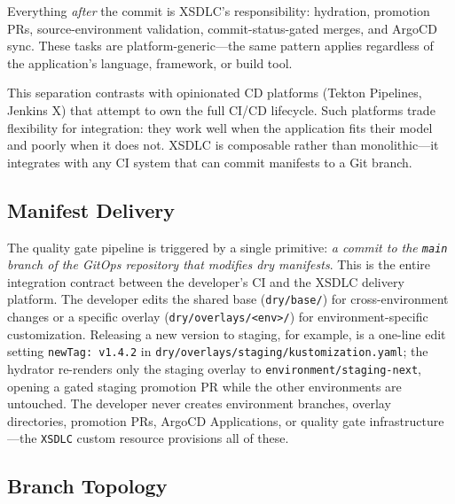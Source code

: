 Everything \textit{after} the commit is XSDLC's responsibility: hydration, promotion PRs, source-environment validation, commit-status-gated merges, and ArgoCD sync. These tasks are platform-generic---the same pattern applies regardless of the application's language, framework, or build tool.

This separation contrasts with opinionated CD platforms (Tekton Pipelines, Jenkins X) that attempt to own the full CI/CD lifecycle. Such platforms trade flexibility for integration: they work well when the application fits their model and poorly when it does not. XSDLC is composable rather than monolithic---it integrates with any CI system that can commit manifests to a Git branch.

\subsection{Manifest Delivery}
\label{subsec:manifest-delivery}

The quality gate pipeline is triggered by a single primitive: \textit{a commit to the \texttt{main} branch of the GitOps repository that modifies dry manifests}. This is the entire integration contract between the developer's CI and the XSDLC delivery platform. The developer edits the shared base (\texttt{dry/base/}) for cross-environment changes or a specific overlay (\texttt{dry/overlays/<env>/}) for environment-specific customization. Releasing a new version to staging, for example, is a one-line edit setting \texttt{newTag:\ v1.4.2} in \texttt{dry/overlays/staging/kustomization.yaml}; the hydrator re-renders only the staging overlay to \texttt{environment/staging-next}, opening a gated staging promotion PR while the other environments are untouched. The developer never creates environment branches, overlay directories, promotion PRs, ArgoCD Applications, or quality gate infrastructure---the \texttt{XSDLC} custom resource provisions all of these.

\subsection{Branch Topology}
\label{subsec:branch-topology}

